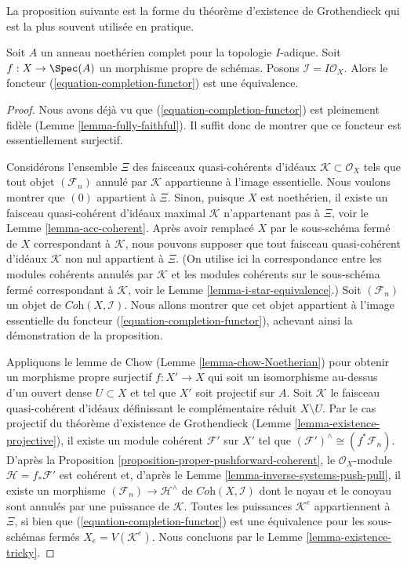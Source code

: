 \noindent
La proposition suivante est la forme du théorème d'existence de Grothendieck
qui est la plus souvent utilisée en pratique.

\begin{proposition}
\label{proposition-existence-proper}
Soit $A$ un anneau noethérien complet pour la topologie $I$-adique.
Soit $f : X \to \Spec(A)$ un morphisme propre de schémas.
Posons $\mathcal{I} = I\mathcal{O}_X$.
Alors le foncteur (\ref{equation-completion-functor}) est une équivalence.
\end{proposition}

\begin{proof}
Nous avons déjà vu que (\ref{equation-completion-functor}) est
pleinement fidèle (Lemme \ref{lemma-fully-faithful}). Il suffit donc
de montrer que ce foncteur est essentiellement surjectif.

\medskip\noindent
Considérons l'ensemble $\Xi$ des faisceaux quasi-cohérents d'idéaux
$\mathcal{K} \subset \mathcal{O}_X$ tels que tout objet
$(\mathcal{F}_n)$ annulé par $\mathcal{K}$ appartienne à l'image essentielle.
Nous voulons montrer que $(0)$ appartient à $\Xi$. Sinon, puisque $X$ est
noethérien, il existe un faisceau quasi-cohérent d'idéaux maximal
$\mathcal{K}$ n'appartenant pas à $\Xi$, voir le
Lemme \ref{lemma-acc-coherent}.
Après avoir remplacé $X$ par le sous-schéma fermé de $X$
correspondant à $\mathcal{K}$, nous pouvons supposer que tout faisceau
quasi-cohérent d'idéaux $\mathcal{K}$ non nul appartient à $\Xi$.
(On utilise ici la correspondance
entre les modules cohérents annulés par $\mathcal{K}$ et les modules cohérents
sur le sous-schéma fermé correspondant à $\mathcal{K}$, voir le
Lemme \ref{lemma-i-star-equivalence}.)
Soit $(\mathcal{F}_n)$ un objet de
$\textit{Coh}(X, \mathcal{I})$.
Nous allons montrer que cet objet appartient à l'image essentielle du
foncteur (\ref{equation-completion-functor}), achevant ainsi la
démonstration de la proposition.

\medskip\noindent
Appliquons le lemme de Chow (Lemme \ref{lemma-chow-Noetherian}) pour obtenir un
morphisme propre surjectif $f : X' \to X$ qui soit un isomorphisme au-dessus
d'un ouvert dense $U \subset X$ et tel que $X'$ soit projectif sur $A$.
Soit $\mathcal{K}$ le faisceau quasi-cohérent d'idéaux définissant
le complémentaire réduit $X \setminus U$. Par le cas projectif
du théorème d'existence de Grothendieck
(Lemme \ref{lemma-existence-projective}),
il existe un module cohérent $\mathcal{F}'$ sur $X'$ tel
que $(\mathcal{F}')^\wedge \cong (f^*\mathcal{F}_n)$. D'après la
Proposition \ref{proposition-proper-pushforward-coherent},
le $\mathcal{O}_X$-module $\mathcal{H} = f_*\mathcal{F}'$ est cohérent
et, d'après le Lemme \ref{lemma-inverse-systems-push-pull},
il existe un morphisme $(\mathcal{F}_n) \to \mathcal{H}^\wedge$
de $\textit{Coh}(X, \mathcal{I})$ dont le noyau et le conoyau sont
annulés par une puissance de $\mathcal{K}$. Toutes les puissances
$\mathcal{K}^e$ appartiennent à $\Xi$, si bien que
(\ref{equation-completion-functor}) est une équivalence pour les
sous-schémas fermés $X_e = V(\mathcal{K}^e)$.
Nous concluons par le Lemme \ref{lemma-existence-tricky}.
\end{proof}
